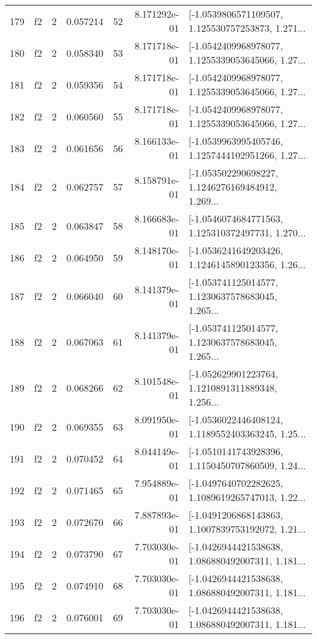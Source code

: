 \begin{tabular}{lllrlrl}
179 &  f2 &   2 &  0.057214 &   52 &  8.171292e-01 &  [-1.0539806571109507, 1.125530757253873, 1.271... \\
180 &  f2 &   2 &  0.058340 &   53 &  8.171718e-01 &  [-1.0542409968978077, 1.1255339053645066, 1.27... \\
181 &  f2 &   2 &  0.059356 &   54 &  8.171718e-01 &  [-1.0542409968978077, 1.1255339053645066, 1.27... \\
182 &  f2 &   2 &  0.060560 &   55 &  8.171718e-01 &  [-1.0542409968978077, 1.1255339053645066, 1.27... \\
183 &  f2 &   2 &  0.061656 &   56 &  8.166133e-01 &  [-1.0539963995405746, 1.1257444102951266, 1.27... \\
184 &  f2 &   2 &  0.062757 &   57 &  8.158791e-01 &  [-1.053502290698227, 1.1246276169484912, 1.269... \\
185 &  f2 &   2 &  0.063847 &   58 &  8.166683e-01 &  [-1.0546074684771563, 1.125310372497731, 1.270... \\
186 &  f2 &   2 &  0.064950 &   59 &  8.148170e-01 &  [-1.0536241649203426, 1.1246145890123356, 1.26... \\
187 &  f2 &   2 &  0.066040 &   60 &  8.141379e-01 &  [-1.053741125014577, 1.1230637578683045, 1.265... \\
188 &  f2 &   2 &  0.067063 &   61 &  8.141379e-01 &  [-1.053741125014577, 1.1230637578683045, 1.265... \\
189 &  f2 &   2 &  0.068266 &   62 &  8.101548e-01 &  [-1.052629901223764, 1.1210891311889348, 1.256... \\
190 &  f2 &   2 &  0.069355 &   63 &  8.091950e-01 &  [-1.0536022446408124, 1.1189552403363245, 1.25... \\
191 &  f2 &   2 &  0.070452 &   64 &  8.044149e-01 &  [-1.0510141743928396, 1.1150450707860509, 1.24... \\
192 &  f2 &   2 &  0.071465 &   65 &  7.954889e-01 &  [-1.0497640702282625, 1.1089619265747013, 1.22... \\
193 &  f2 &   2 &  0.072670 &   66 &  7.887893e-01 &  [-1.0491206868143863, 1.1007839753192072, 1.21... \\
194 &  f2 &   2 &  0.073790 &   67 &  7.703030e-01 &  [-1.0426944421538638, 1.086880492007311, 1.181... \\
195 &  f2 &   2 &  0.074910 &   68 &  7.703030e-01 &  [-1.0426944421538638, 1.086880492007311, 1.181... \\
196 &  f2 &   2 &  0.076001 &   69 &  7.703030e-01 &  [-1.0426944421538638, 1.086880492007311, 1.181... \\

\end{tabular}
